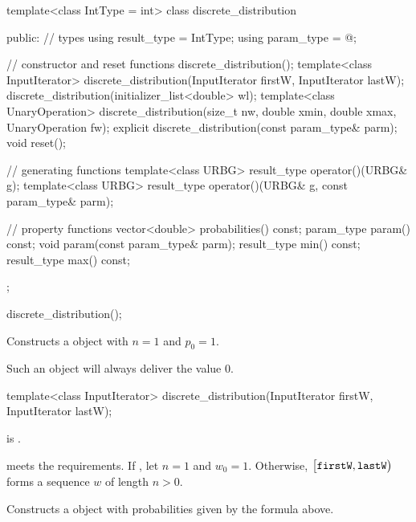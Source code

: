 %
%
\begin{codeblock}
template<class IntType = int>
  class discrete_distribution {
  public:
    // types
    using result_type = IntType;
    using param_type  = @\unspec@;

    // constructor and reset functions
    discrete_distribution();
    template<class InputIterator>
      discrete_distribution(InputIterator firstW, InputIterator lastW);
    discrete_distribution(initializer_list<double> wl);
    template<class UnaryOperation>
      discrete_distribution(size_t nw, double xmin, double xmax, UnaryOperation fw);
    explicit discrete_distribution(const param_type& parm);
    void reset();

    // generating functions
    template<class URBG>
      result_type operator()(URBG& g);
    template<class URBG>
      result_type operator()(URBG& g, const param_type& parm);

    // property functions
    vector<double> probabilities() const;
    param_type param() const;
    void param(const param_type& parm);
    result_type min() const;
    result_type max() const;
  };
\end{codeblock}

\begin{itemdecl}
discrete_distribution();
\end{itemdecl}

\begin{itemdescr}
\pnum
\effects
Constructs a  object
with $n = 1$ and $p_0 = 1$.
\begin{note}
Such an object will always deliver the value $0$.
\end{note}
\end{itemdescr}


%
\begin{itemdecl}
template<class InputIterator>
  discrete_distribution(InputIterator firstW, InputIterator lastW);
\end{itemdecl}

\begin{itemdescr}
\pnum
\mandates
{} is .

\pnum
\expects
   meets the
   requirements.
 If ,
 let $n = 1$ and $w_0 = 1$.
 Otherwise,
 $\bigl[\texttt{firstW}, \texttt{lastW}\bigr)$
 forms a sequence $w$ of length $n > 0$.

\pnum
\effects
Constructs a  object
with probabilities given by the formula above.
\end{itemdescr}


